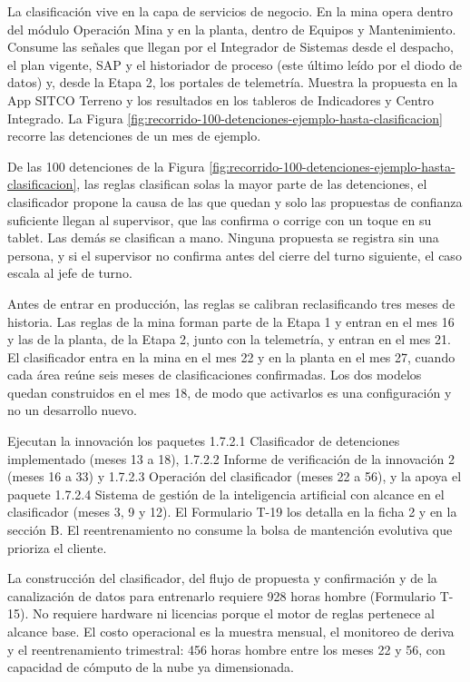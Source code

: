 \documentclass[subdoc]{../../comun/overfore}
\begin{document}
La clasificación vive en la capa de servicios de negocio. En la mina opera dentro del módulo Operación Mina y en la planta, dentro de Equipos y Mantenimiento. Consume las señales que llegan por el Integrador de Sistemas desde el despacho, el plan vigente, SAP y el historiador de proceso (este último leído por el diodo de datos) y, desde la Etapa 2, los portales de telemetría. Muestra la propuesta en la App SITCO Terreno y los resultados en los tableros de Indicadores y Centro Integrado. La Figura \ref{fig:recorrido-100-detenciones-ejemplo-hasta-clasificacion} recorre las detenciones de un mes de ejemplo.

De las 100 detenciones de la Figura \ref{fig:recorrido-100-detenciones-ejemplo-hasta-clasificacion}, las reglas clasifican solas la mayor parte de las detenciones, el clasificador propone la causa de las que quedan y solo las propuestas de confianza suficiente llegan al supervisor, que las confirma o corrige con un toque en su tablet. Las demás se clasifican a mano. Ninguna propuesta se registra sin una persona, y si el supervisor no confirma antes del cierre del turno siguiente, el caso escala al jefe de turno.

Antes de entrar en producción, las reglas se calibran reclasificando tres meses de historia. Las reglas de la mina forman parte de la Etapa 1 y entran en el mes 16 y las de la planta, de la Etapa 2, junto con la telemetría, y entran en el mes 21. El clasificador entra en la mina en el mes 22 y en la planta en el mes 27, cuando cada área reúne seis meses de clasificaciones confirmadas. Los dos modelos quedan construidos en el mes 18, de modo que activarlos es una configuración y no un desarrollo nuevo.

Ejecutan la innovación los paquetes 1.7.2.1 Clasificador de detenciones implementado (meses 13 a 18), 1.7.2.2 Informe de verificación de la innovación 2 (meses 16 a 33) y 1.7.2.3 Operación del clasificador (meses 22 a 56), y la apoya el paquete 1.7.2.4 Sistema de gestión de la inteligencia artificial con alcance en el clasificador (meses 3, 9 y 12). El Formulario T-19 los detalla en la ficha 2 y en la sección B. El reentrenamiento no consume la bolsa de mantención evolutiva que prioriza el cliente.

La construcción del clasificador, del flujo de propuesta y confirmación y de la canalización de datos para entrenarlo requiere 928 horas hombre (Formulario T-15). No requiere hardware ni licencias porque el motor de reglas pertenece al alcance base. El costo operacional es la muestra mensual, el monitoreo de deriva y el reentrenamiento trimestral: 456 horas hombre entre los meses 22 y 56, con capacidad de cómputo de la nube ya dimensionada.
\end{document}
